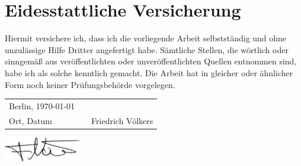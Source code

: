 \documentclass[a4paper,12pt]{report}
\numberwithin{equation}{chapter}
\begin{document}
\appendix
\clearpage
{}


% 

\printbibliography

\clearpage


\begin{minipage}{\textwidth}
    \printglossary[type=main,title=Glossar]
    \vspace{7em} %
    \printglossary[type=\acronymtype,title=Abkürzungsverzeichnis]
\end{minipage}



\clearpage
\chapter*{Eidesstattliche Versicherung}
Hiermit versichere ich, dass ich die vorliegende Arbeit selbstständig und ohne unzulässige Hilfe Dritter angefertigt habe. Sämtliche Stellen, die wörtlich oder sinngemäß aus veröffentlichten oder unveröffentlichten Quellen entnommen sind, habe ich als solche kenntlich gemacht. Die Arbeit hat in gleicher oder ähnlicher Form noch keiner Prüfungsbehörde vorgelegen.

\vspace{3cm}

\begin{table}[h]
    \begin{tabularx}{\textwidth}{p{5cm}X p{5cm}}
        Berlin, \today           &  &                                 \\\cline{1-1} \cline{3-3}
        \vspace{0.1em}Ort, Datum &  & \vspace{0.1em}Friedrich Völkers
    \end{tabularx}
\end{table}


\vspace{-3.3cm}
\begin{center}
    \hspace{11cm}\includegraphics[width=0.25\textwidth]{images/signature.png} %
\end{center}
\end{document}
